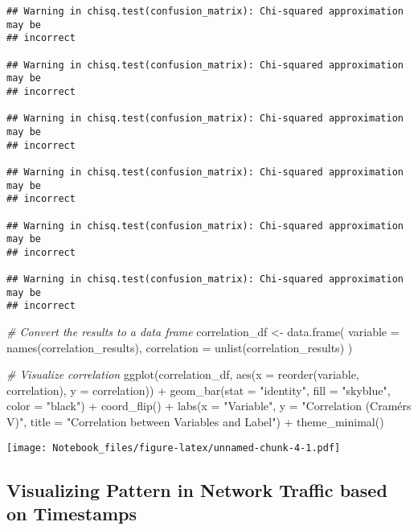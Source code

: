 \documentclass[
]{article}
\newenvironment{Shaded}{\begin{snugshade}}{\end{snugshade}}
\newcommand{\AttributeTok}[1]{\textcolor[rgb]{0.77,0.63,0.00}{#1}}
\newcommand{\CommentTok}[1]{\textcolor[rgb]{0.56,0.35,0.01}{\textit{#1}}}
\newcommand{\FunctionTok}[1]{\textcolor[rgb]{0.00,0.00,0.00}{#1}}
\newcommand{\NormalTok}[1]{#1}
\newcommand{\OtherTok}[1]{\textcolor[rgb]{0.56,0.35,0.01}{#1}}
\newcommand{\SpecialCharTok}[1]{\textcolor[rgb]{0.00,0.00,0.00}{#1}}
\newcommand{\StringTok}[1]{\textcolor[rgb]{0.31,0.60,0.02}{#1}}
\begin{document}
\begin{verbatim}
## Warning in chisq.test(confusion_matrix): Chi-squared approximation may be
## incorrect

## Warning in chisq.test(confusion_matrix): Chi-squared approximation may be
## incorrect

## Warning in chisq.test(confusion_matrix): Chi-squared approximation may be
## incorrect

## Warning in chisq.test(confusion_matrix): Chi-squared approximation may be
## incorrect

## Warning in chisq.test(confusion_matrix): Chi-squared approximation may be
## incorrect

## Warning in chisq.test(confusion_matrix): Chi-squared approximation may be
## incorrect
\end{verbatim}

\begin{Shaded}
\begin{Highlighting}[]
\CommentTok{\# Convert the results to a data frame}
\NormalTok{correlation\_df }\OtherTok{\textless{}{-}} \FunctionTok{data.frame}\NormalTok{(}
  \AttributeTok{variable =} \FunctionTok{names}\NormalTok{(correlation\_results),}
  \AttributeTok{correlation =} \FunctionTok{unlist}\NormalTok{(correlation\_results)}
\NormalTok{)}

\CommentTok{\# Visualize correlation}
\FunctionTok{ggplot}\NormalTok{(correlation\_df, }\FunctionTok{aes}\NormalTok{(}\AttributeTok{x =} \FunctionTok{reorder}\NormalTok{(variable, correlation), }\AttributeTok{y =}\NormalTok{ correlation)) }\SpecialCharTok{+}
  \FunctionTok{geom\_bar}\NormalTok{(}\AttributeTok{stat =} \StringTok{"identity"}\NormalTok{, }\AttributeTok{fill =} \StringTok{"skyblue"}\NormalTok{, }\AttributeTok{color =} \StringTok{"black"}\NormalTok{) }\SpecialCharTok{+}
  \FunctionTok{coord\_flip}\NormalTok{() }\SpecialCharTok{+}
  \FunctionTok{labs}\NormalTok{(}\AttributeTok{x =} \StringTok{"Variable"}\NormalTok{, }\AttributeTok{y =} \StringTok{"Correlation (Cramér\textquotesingle{}s V)"}\NormalTok{,}
       \AttributeTok{title =} \StringTok{"Correlation between Variables and Label"}\NormalTok{) }\SpecialCharTok{+}
  \FunctionTok{theme\_minimal}\NormalTok{()}
\end{Highlighting}
\end{Shaded}

\texttt{[image: Notebook\_files/figure-latex/unnamed-chunk-4-1.pdf]}

\hypertarget{visualizing-pattern-in-network-traffic-based-on-timestamps}{%
\subsection{Visualizing Pattern in Network Traffic based on
Timestamps}\label{visualizing-pattern-in-network-traffic-based-on-timestamps}}
\end{document}
